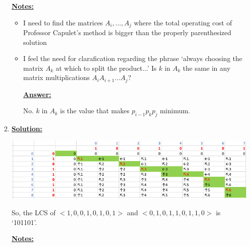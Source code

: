 \documentclass[12pt]{article}
\begin{document}
\begin{enumerate}[1.]

    \bigskip

    \underline{\textbf{Notes:}}

    \bigskip

    \begin{itemize}
        \item I need to find the matrices $A_i, ..., A_j$ where the total operating cost of Professor Capulet's
        method is bigger than the properly parenthesized solution
        \item I feel the need for clarafication regarding the phrase `always choosing the matrix $A_k$ at which to split the product...'
        Is $k$ in $A_k$ the same in any matrix multiplications $A_iA_{i+1}...A_j$?

        \bigskip

        \underline{\textbf{Answer:}}

        \bigskip

        No. $k$ in $A_k$ is the value that makes $p_{i-1}p_kp_j$ minimum.
    \end{itemize}

    \item

    \bigskip

    \underline{\textbf{Solution:}}

    \bigskip

    \begin{center}
    \includegraphics[width=\linewidth]{images/worksheet_3_solution_20.png}
    \end{center}

    \bigskip

    So, the LCS of $<1,0,0,1,0,1,0,1>$ and $<0,1,0,1,1,0,1,1,0>$ is `101101'.

    \bigskip

    \underline{\textbf{Notes:}}

    \bigskip


\end{enumerate}
\end{document}
